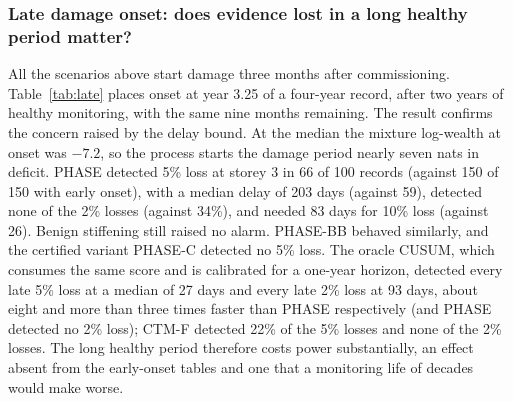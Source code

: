 \documentclass[12pt,a4paper]{article}
\newenvironment{revblock}{}{}
\newenvironment{revblock}{\begingroup\color{revcol}}{\endgroup}
\begin{document}
\begin{revblock}
\subsubsection{Late damage onset: does evidence lost in a long healthy period matter?}\label{sec:res-late}

All the scenarios above start damage three months after commissioning. Table~\ref{tab:late} places onset at year 3.25 of a four-year record, after two years of healthy monitoring, with the same nine months remaining. The result confirms the concern raised by the delay bound. At the median the mixture log-wealth at onset was $-7.2$, so the process starts the damage period nearly seven nats in deficit. PHASE detected 5\% loss at storey 3 in 66 of 100 records (against 150 of 150 with early onset), with a median delay of 203 days (against 59), detected none of the 2\% losses (against 34\%), and needed 83 days for 10\% loss (against 26). Benign stiffening still raised no alarm. PHASE-BB behaved similarly, and the certified variant PHASE-C detected no 5\% loss. The oracle CUSUM, which consumes the same score and is calibrated for a one-year horizon, detected every late 5\% loss at a median of 27 days and every late 2\% loss at 93 days, about eight and more than three times faster than PHASE respectively (and PHASE detected no 2\% loss); CTM-F detected 22\% of the 5\% losses and none of the 2\% losses. The long healthy period therefore costs power substantially, an effect absent from the early-onset tables and one that a monitoring life of decades would make worse.


\end{revblock}
\end{document}
